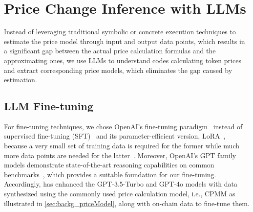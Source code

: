 \section{Price Change Inference with LLMs}
\label{sec:priceInfer}

Instead of leveraging traditional symbolic or concrete execution techniques to estimate the price model through input and output data points, which results in a significant gap between the actual price calculation formulas and the approximating ones, we use LLMs to understand codes calculating token prices and extract corresponding price models, which eliminates the gap caused by estimation.
\subsection{LLM Fine-tuning}
\label{sec:finetune}

For fine-tuning techniques, we chose OpenAI's fine-tuning paradigm~\cite{OpenAI_Fine-tuning} instead of supervised fine-tuning (SFT)~\cite{chung2024scaling} and its parameter-efficient version, LoRA~\cite{hu2021lora}, because a very small set of training data is required for the former while much more data points are needed for the latter~\cite{ma2024combining}.
Moreover, OpenAI's GPT family models demonstrate state-of-the-art reasoning capabilities on common benchmarks~\cite{LLM_Leaderboard, sun2024llm4vuln}, which provides a suitable foundation for our fine-tuning.
Accordingly, \name has enhanced the GPT-3.5-Turbo and GPT-4o models with data synthesized using the commonly used price calculation model, i.e., CPMM as illustrated in \mysec\ref{sec:backg_priceModel}, along with on-chain data to fine-tune them.


